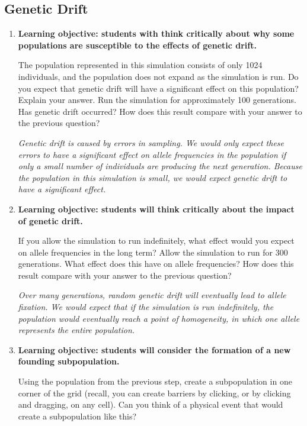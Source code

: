 \documentclass[12pt]{article}
\begin{document}
\begin{spacing}{1.6}
\subsection{Genetic Drift}
\begin{enumerate}
\item
\par \textbf{Learning objective: students with think critically about why some populations are susceptible to the effects of genetic drift.}
\par The population represented in this simulation consists of only 1024 individuals, and the population does not expand as the simulation is run. Do you expect that genetic drift will have a significant effect on this population? Explain your answer. Run the simulation for approximately 100 generations. Has genetic drift occurred? How does this result compare with your answer to the previous question?
\par \textit{Genetic drift is caused by errors in sampling. We would only expect these errors to have a significant effect on allele frequencies in the population if only a small number of individuals are producing the next generation. Because the population in this simulation is small, we would expect genetic drift to have a significant effect.}
\item
\par \textbf{Learning objective: students will think critically about the impact of genetic drift.}
\par If you allow the simulation to run indefinitely, what effect would you expect on allele frequencies in the long term? Allow the simulation to run for 300 generations. What effect does this have on allele frequencies? How does this result compare with your answer to the previous question?
\par \textit{Over many generations, random genetic drift will eventually lead to allele fixation. We would expect that if the simulation is run indefinitely, the population would eventually reach a point of homogeneity, in which one allele represents the entire population.}
\item
\par \textbf{Learning objective: students will consider the formation of a new founding subpopulation.}
\par Using the population from the previous step, create a subpopulation in one corner of the grid (recall, you can create barriers by clicking, or by clicking and dragging, on any cell). Can you think of a physical event that would create a subpopulation like this?

\end{enumerate}
\end{spacing}
\end{document}
